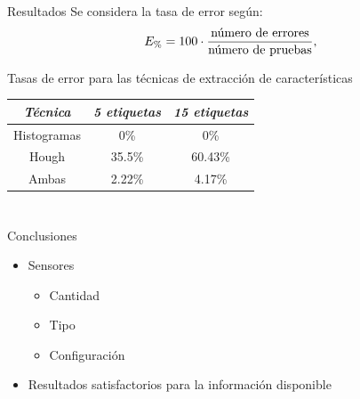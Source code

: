 \documentclass[spanish]{beamer}
\begin{document}
\section[Resultados]{}
\begin{frame}{Resultados}
  Se considera la tasa de error según:
  \begin{equation*}
    E_{\%}=100\cdot\frac{\textrm{número de errores}}{\textrm{número de pruebas}},
  \end{equation*}


  Tasas de error para las técnicas de extracción de características
  \begin{center}\begin{tabular}{ccc}
      \hline \emph{{Técnica}} & \emph{5 etiquetas} & \emph{15 etiquetas}\\
      \hline Histogramas & 0\% & 0\%\\
      \hline Hough & 35.5\% & 60.43\%\\
      \hline Ambas & 2.22\% & 4.17\%\\
      \hline
  \end{tabular}\end{center}
  \label{tablaerrores}


\end{frame}


\section[Conclusiones]{}

\begin{frame}{Conclusiones}
  \begin{itemize}
  \item Sensores
    \begin{itemize}
    \item Cantidad
    \item Tipo
    \item Configuración
    \end{itemize}
  \item Resultados satisfactorios para la información disponible
  \end{itemize}
\end{frame}
\end{document}
